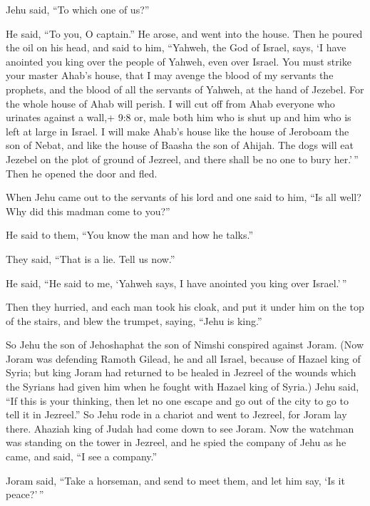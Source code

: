Jehu said, ``To which one of us?''

He said, ``To you, O captain.''  He arose, and went into the
house. Then he poured the oil on his head, and said to him, ``Yahweh,
the God of Israel, says, `I have anointed you king over the people of
Yahweh, even over Israel.  You must strike your master
Ahab's house, that I may avenge the blood of my servants the prophets,
and the blood of all the servants of Yahweh, at the hand of Jezebel.
 For the whole house of Ahab will perish. I will cut off
from Ahab everyone who urinates against a wall,+ 9:8 or, male both him
who is shut up and him who is left at large in Israel.  I
will make Ahab's house like the house of Jeroboam the son of Nebat, and
like the house of Baasha the son of Ahijah.  The dogs will
eat Jezebel on the plot of ground of Jezreel, and there shall be no one
to bury her.'\,'' Then he opened the door and fled.

 When Jehu came out to the servants of his lord and one
said to him, ``Is all well? Why did this madman come to you?''

He said to them, ``You know the man and how he talks.''

 They said, ``That is a lie. Tell us now.''

He said, ``He said to me, `Yahweh says, I have anointed you king over
Israel.'\,''

 Then they hurried, and each man took his cloak, and put it
under him on the top of the stairs, and blew the trumpet, saying, ``Jehu
is king.''

 So Jehu the son of Jehoshaphat the son of Nimshi conspired
against Joram. (Now Joram was defending Ramoth Gilead, he and all
Israel, because of Hazael king of Syria;  but king Joram
had returned to be healed in Jezreel of the wounds which the Syrians had
given him when he fought with Hazael king of Syria.) Jehu said, ``If
this is your thinking, then let no one escape and go out of the city to
go to tell it in Jezreel.''  So Jehu rode in a chariot and
went to Jezreel, for Joram lay there. Ahaziah king of Judah had come
down to see Joram.  Now the watchman was standing on the
tower in Jezreel, and he spied the company of Jehu as he came, and said,
``I see a company.''

Joram said, ``Take a horseman, and send to meet them, and let him say,
`Is it peace?'\,''

